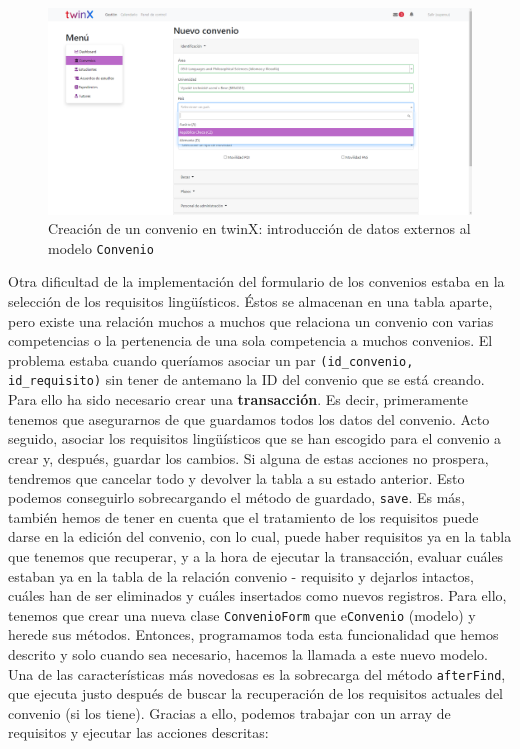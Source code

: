 \begin{figure}
	\centering
	\includegraphics[width=\linewidth]{img/Capturas de twinX/creacion_convenio_3}
	\caption[Creación de un convenio en twinX 3]{Creación de un convenio en twinX: introducción de datos externos al modelo \texttt{Convenio}}
	\label{fig:creacionconvenio3}
\end{figure}

Otra dificultad de la implementación del formulario de los convenios estaba en la selección de los requisitos lingüísticos. Éstos se almacenan en una tabla aparte, pero existe una relación muchos a muchos que relaciona un convenio con varias competencias o la pertenencia de una sola competencia a muchos convenios. El problema estaba cuando queríamos asociar un par \texttt{(id\_convenio, id\_requisito)} sin tener de antemano la ID del convenio que se está creando. Para ello ha sido necesario crear una \textbf{transacción}. Es decir, primeramente tenemos que asegurarnos de que guardamos todos los datos del convenio. Acto seguido, asociar los requisitos lingüísticos que se han escogido para el convenio a crear y, después, guardar los cambios. Si alguna de estas acciones no prospera, tendremos que cancelar todo y devolver la tabla a su estado anterior. Esto podemos conseguirlo sobrecargando el método de guardado, \texttt{save}.
Es más, también hemos de tener en cuenta que el tratamiento de los requisitos puede darse en la edición del convenio, con lo cual, puede haber requisitos ya en la tabla que tenemos que recuperar, y a la hora de ejecutar la transacción, evaluar cuáles estaban ya en la tabla de la relación convenio - requisito y dejarlos intactos, cuáles han de ser eliminados y cuáles insertados como nuevos registros.
Para ello, tenemos que crear una nueva clase \texttt{ConvenioForm} que e\texttt{Convenio} (modelo) y herede sus métodos. Entonces, programamos toda esta funcionalidad que hemos descrito y solo cuando sea necesario, hacemos la llamada a este nuevo modelo. Una de las características más novedosas es la sobrecarga del método \texttt{afterFind}, que ejecuta justo después de buscar la recuperación de los requisitos actuales del convenio (si los tiene). Gracias a ello, podemos trabajar con un array de requisitos y ejecutar las acciones descritas:

